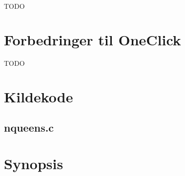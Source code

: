 \documentclass[final,a4paper,10pt]{article}
\begin{document}


TODO
\section{Forbedringer til OneClick}
%
TODO


%




\appendix


\section{Kildekode}
\subsection{nqueens.c}
%

\section{Synopsis}
%



%
\end{document}
